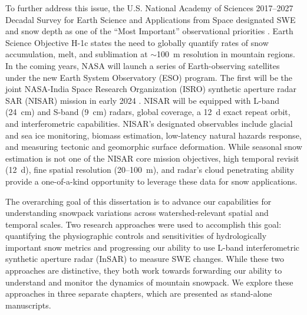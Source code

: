 To further address this issue, the U.S. National Academy of Sciences 2017--2027 Decadal Survey for Earth Science and Applications from Space designated SWE and snow depth as one of the ``Most Important” observational priorities \citep{nationalacademiesofsciencesengineeringandmedicineThrivingOurChanging2019}. Earth Science Objective H-1c states the need to globally quantify rates of snow accumulation, melt, and sublimation at $\sim$100~m resolution in mountain regions. In the coming years, NASA will launch a series of Earth-observing satellites under the new Earth System Observatory (ESO) program. The first will be the joint NASA-India Space Research Organization (ISRO) synthetic aperture radar SAR (NISAR) mission in early 2024 \citep{rosenNASAISROSARNISAR2017, kelloggNASAISROSyntheticAperture2020}. NISAR will be equipped with L-band (24~cm) and S-band (9~cm) radars, global coverage, a 12~d exact repeat orbit, and interferometric capabilities. NISAR’s designated observables include glacial and sea ice monitoring, biomass estimation, low-latency natural hazards response, and measuring tectonic and geomorphic surface deformation. While seasonal snow estimation is not one of the NISAR core mission objectives, high temporal revisit (12~d), fine spatial resolution (20--100~m), and radar’s cloud penetrating ability provide a one-of-a-kind opportunity to leverage these data for snow applications.

The overarching goal of this dissertation is to advance our capabilities for understanding snowpack variations across watershed-relevant spatial and temporal scales. Two research approaches were used to accomplish this goal: quantifying the physiographic controls and sensitivities of hydrologically important snow metrics and progressing our ability to use L-band interferometric synthetic aperture radar (InSAR) to measure SWE changes. While these two approaches are distinctive, they both work towards forwarding our ability to understand and monitor the dynamics of mountain snowpack. We explore these approaches in three separate chapters, which are presented as stand-alone manuscripts. 

